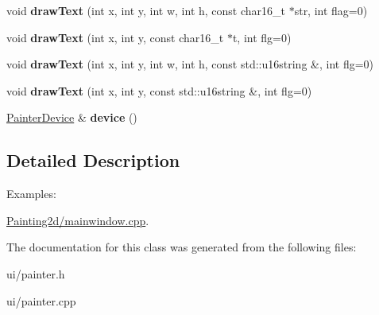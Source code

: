 \begin{DoxyCompactItemize}
\item 
\hypertarget{class_tempest_1_1_painter_a214878601222a57c3071669db3e4ea0e}{void {\bfseries draw\+Text} (int x, int y, int w, int h, const char16\+\_\+t $\ast$str, int flag=0)}\label{class_tempest_1_1_painter_a214878601222a57c3071669db3e4ea0e}

\item 
\hypertarget{class_tempest_1_1_painter_a6bf56fea9dc6736dc1308703e39b456c}{void {\bfseries draw\+Text} (int x, int y, const char16\+\_\+t $\ast$t, int flg=0)}\label{class_tempest_1_1_painter_a6bf56fea9dc6736dc1308703e39b456c}

\item 
\hypertarget{class_tempest_1_1_painter_ac0e6d3bebd5f604eefd5d3c715393841}{void {\bfseries draw\+Text} (int x, int y, int w, int h, const std\+::u16string \&, int flg=0)}\label{class_tempest_1_1_painter_ac0e6d3bebd5f604eefd5d3c715393841}

\item 
\hypertarget{class_tempest_1_1_painter_a3fea1b38e5e3996899f68024ada6d813}{void {\bfseries draw\+Text} (int x, int y, const std\+::u16string \&, int flg=0)}\label{class_tempest_1_1_painter_a3fea1b38e5e3996899f68024ada6d813}

\item 
\hypertarget{class_tempest_1_1_painter_ac77b4c143b72f43ff5b7ef4de8a18221}{\hyperlink{class_tempest_1_1_painter_device}{Painter\+Device} \& {\bfseries device} ()}\label{class_tempest_1_1_painter_ac77b4c143b72f43ff5b7ef4de8a18221}

\end{DoxyCompactItemize}


\subsection{Detailed Description}
\begin{Desc}
\item[Examples\+: ]\par
\hyperlink{_painting2d_2mainwindow_8cpp-example}{Painting2d/mainwindow.\+cpp}.\end{Desc}


The documentation for this class was generated from the following files\+:\begin{DoxyCompactItemize}
\item 
ui/painter.\+h\item 
ui/painter.\+cpp\end{DoxyCompactItemize}
